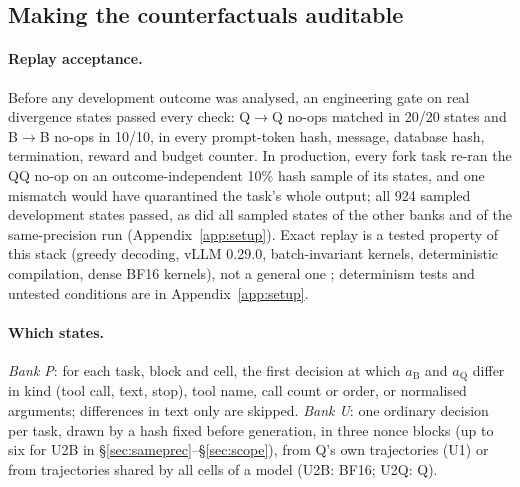 \subsection{Making the counterfactuals auditable}
\label{sec:replay}

\paragraph{Replay acceptance.} Before any development outcome was analysed, an engineering gate on real divergence states passed every check: Q$\rightarrow$Q no-ops matched in 20/20 states and B$\rightarrow$B no-ops in 10/10, in every prompt-token hash, message, database hash, termination, reward and budget counter. %
In production, every fork task re-ran the QQ no-op on an outcome-independent 10\% hash sample of its states, and one mismatch would have quarantined the task's whole output; all 924 sampled development states passed, as did all sampled states of the other banks and of the same-precision run (Appendix~\ref{app:setup}). %
Exact replay is a tested property of this stack (greedy decoding, vLLM 0.29.0, batch-invariant kernels, deterministic compilation, dense BF16 kernels), not a general one \citep{yuan2025nondeterminism}; determinism tests and untested conditions are in Appendix~\ref{app:setup}. %

\paragraph{Which states.} \emph{Bank P}: for each task, block and cell, the first decision at which $a_{\mathrm{B}}$ and $a_{\mathrm{Q}}$ differ in kind (tool call, text, stop), tool name, call count or order, or normalised arguments; differences in text only are skipped. \emph{Bank U}: one ordinary decision per task, drawn by a hash fixed before generation, in three nonce blocks (up to six for U2B in \S\ref{sec:sameprec}--\S\ref{sec:scope}), from Q's own trajectories (U1) or from trajectories shared by all cells of a model (U2B: BF16; U2Q: Q). %


